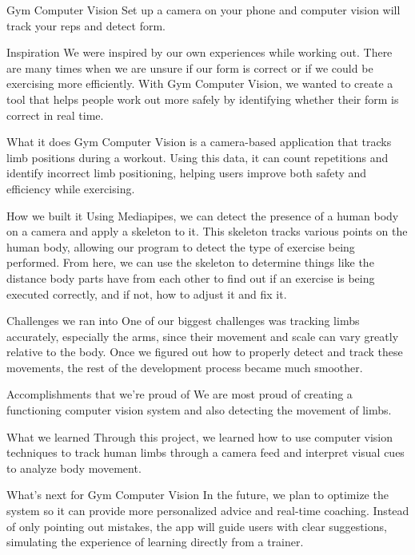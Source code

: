 Gym Computer Vision
Set up a camera on your phone and computer vision will track your reps and detect form.

Inspiration
We were inspired by our own experiences while working out. There are many times when we are unsure if our form is correct or if we could be exercising more efficiently. With Gym Computer Vision, we wanted to create a tool that helps people work out more safely by identifying whether their form is correct in real time.

What it does
Gym Computer Vision is a camera-based application that tracks limb positions during a workout. Using this data, it can count repetitions and identify incorrect limb positioning, helping users improve both safety and efficiency while exercising.

How we built it
Using Mediapipes, we can detect the presence of a human body on a camera and apply a skeleton to it. This skeleton tracks various points on the human body, allowing our program to detect the type of exercise being performed. From here, we can use the skeleton to determine things like the distance body parts have from each other to find out if an exercise is being executed correctly, and if not, how to adjust it and fix it.

Challenges we ran into
One of our biggest challenges was tracking limbs accurately, especially the arms, since their movement and scale can vary greatly relative to the body. Once we figured out how to properly detect and track these movements, the rest of the development process became much smoother.

Accomplishments that we're proud of
We are most proud of creating a functioning computer vision system and also detecting the movement of limbs.

What we learned
Through this project, we learned how to use computer vision techniques to track human limbs through a camera feed and interpret visual cues to analyze body movement.

What's next for Gym Computer Vision
In the future, we plan to optimize the system so it can provide more personalized advice and real-time coaching. Instead of only pointing out mistakes, the app will guide users with clear suggestions, simulating the experience of learning directly from a trainer.

